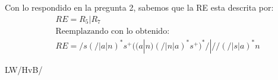 \documentclass[spanish, fleqn]{article}
\begin{document}
\begin{enumerate}
    Con lo respondido en la pregunta 2, sabemos que la RE esta descrita por:
    \begin{align*}
    &RE=R_5|R_7\\
    &\text{Reemplazando con lo obtenido:}\\
    &RE=/s(/|a|n)^*s^+((a|n)(/|n|a)^*s^+)^*/|//(/|s|a)^*n
    \end{align*}
  \end{enumerate}


  \vfill\hfill LW/HvB/\LaTeXe
\end{document}
